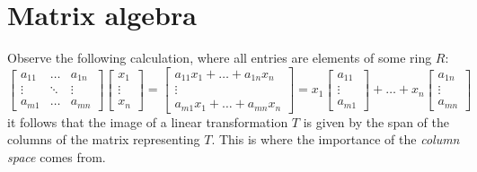 \documentclass[12pt]{article}
\theoremstyle{plain}
\theoremstyle{definition}
\begin{document}
\section{Matrix algebra}
Observe the following calculation, where all entries are elements of some ring $R$:
\begin{equation}
    \begin{bmatrix}
    a_{11} & \hdots & a_{1n}\\
    \vdots & \ddots & \vdots\\
    a_{m1} & \hdots & a_{mn}
    \end{bmatrix}
    \begin{bmatrix}
    x_1\\
    \vdots\\
    x_n
    \end{bmatrix}
    =
    \begin{bmatrix}
    a_{11}x_1 + \hdots + a_{1n}x_n\\
    \vdots\\
    a_{m1}x_1 + \hdots + a_{mn}x_n
    \end{bmatrix}
    =
    x_1
    \begin{bmatrix}
    a_{11}\\
    \vdots\\
    a_{m1}
    \end{bmatrix}
    + \hdots +
    x_n
    \begin{bmatrix}
    a_{1n}\\
    \vdots\\
    a_{mn}
    \end{bmatrix}
\end{equation}
it follows that the image of a linear transformation $T$ is given by the span of the columns of the matrix representing $T$. This is where the importance of the \emph{column space} comes from.
\end{document}
